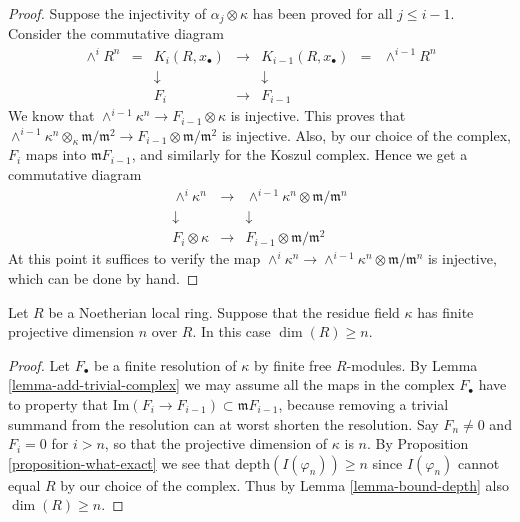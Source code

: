\begin{proof}
\medskip\noindent
Suppose the injectivity of $\alpha_j \otimes \kappa$ has been
proved for all $j \leq i - 1$. Consider the commutative diagram
$$
\begin{matrix}
\wedge^i R^n & = & K_i(R, x_{\bullet}) & \to & K_{i-1}(R,x_{\bullet})
& = & \wedge^{i-1} R^n \\
& & \downarrow & & \downarrow & & \\
& & F_i & \to & F_{i-1} & &
\end{matrix}
$$
We know that $\wedge^{i-1} \kappa^n \to F_{i-1} \otimes \kappa$
is injective. This proves that
$\wedge^{i-1} \kappa^n \otimes_{\kappa} \mathfrak m/\mathfrak m^2
\to F_{i-1} \otimes \mathfrak m/\mathfrak m^2$ is injective.
Also, by our choice of the complex, $F_i$ maps into
$\mathfrak mF_{i-1}$, and similarly for the Koszul complex.
Hence we get a commutative diagram
$$
\begin{matrix}
\wedge^i \kappa^n & \to &
\wedge^{i-1} \kappa^n \otimes \mathfrak m/\mathfrak m^n \\
\downarrow & & \downarrow \\
F_i \otimes \kappa & \to & F_{i-1}\otimes \mathfrak m/\mathfrak m^2
\end{matrix}
$$
At this point it suffices to verify the map
$\wedge^i \kappa^n \to 
\wedge^{i-1} \kappa^n \otimes \mathfrak m/\mathfrak m^n$
is injective, which can be done by hand.
\end{proof}

\begin{lemma}
\label{lemma-dim-gl-dim}
Let $R$ be a Noetherian local ring.
Suppose that the residue field $\kappa$ has finite
projective dimension $n$ over $R$.
In this case $\dim(R) \geq n$.
\end{lemma}

\begin{proof}
Let $F_{\bullet}$ be a finite resolution of $\kappa$ by finite free
$R$-modules. By Lemma \ref{lemma-add-trivial-complex} 
we may assume all the maps in the complex $F_{\bullet}$
have to property that $\text{Im}(F_i \to F_{i-1})
\subset \mathfrak m F_{i-1}$, because removing a trivial
summand from the resolution can at worst shorten the resolution.
Say $F_n \not = 0$ and $F_i = 0$ for $i > n$, so that
the projective dimension of $\kappa$ is $n$.
By Proposition \ref{proposition-what-exact} we see that
$\text{depth}(I(\varphi_n)) \geq n$ since $I(\varphi_n)$
cannot equal $R$ by our choice of the complex.
Thus by Lemma \ref{lemma-bound-depth} also $\dim(R) \geq n$.
\end{proof}

